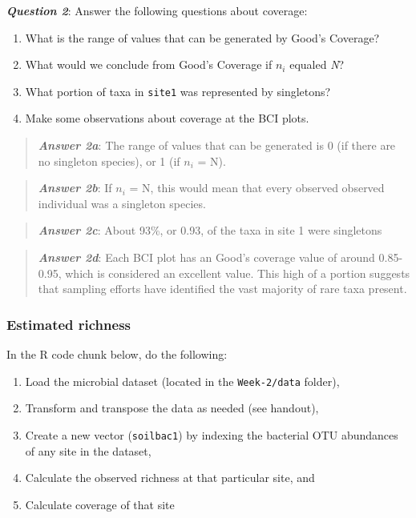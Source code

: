 \documentclass[
]{article}
\providecommand{\tightlist}{%
  \setlength{\itemsep}{0pt}\setlength{\parskip}{0pt}}
\begin{document}
\textbf{\emph{Question 2}}: Answer the following questions about
coverage:

\begin{enumerate}
\def\labelenumi{\alph{enumi}.}
\tightlist
\item
  What is the range of values that can be generated by Good's Coverage?
\item
  What would we conclude from Good's Coverage if \(n_{i}\) equaled
  \emph{N}?
\item
  What portion of taxa in \texttt{site1} was represented by singletons?
\item
  Make some observations about coverage at the BCI plots.
\end{enumerate}

\begin{quote}
\textbf{\emph{Answer 2a}}: The range of values that can be generated is
0 (if there are no singleton species), or 1 (if \(n_i\) = N).
\end{quote}

\begin{quote}
\textbf{\emph{Answer 2b}}: If \(n_i\) = N, this would mean that every
observed observed individual was a singleton species.
\end{quote}

\begin{quote}
\textbf{\emph{Answer 2c}}: About 93\%, or 0.93, of the taxa in site 1
were singletons
\end{quote}

\begin{quote}
\textbf{\emph{Answer 2d}}: Each BCI plot has an Good's coverage value of
around 0.85-0.95, which is considered an excellent value. This high of a
portion suggests that sampling efforts have identified the vast majority
of rare taxa present.
\end{quote}

\subsubsection{Estimated richness}\label{estimated-richness}

In the R code chunk below, do the following:

\begin{enumerate}
\def\labelenumi{\arabic{enumi}.}
\item
  Load the microbial dataset (located in the \texttt{Week-2/data}
  folder),
\item
  Transform and transpose the data as needed (see handout),
\item
  Create a new vector (\texttt{soilbac1}) by indexing the bacterial OTU
  abundances of any site in the dataset,
\item
  Calculate the observed richness at that particular site, and
\item
  Calculate coverage of that site
\end{enumerate}
\end{document}
